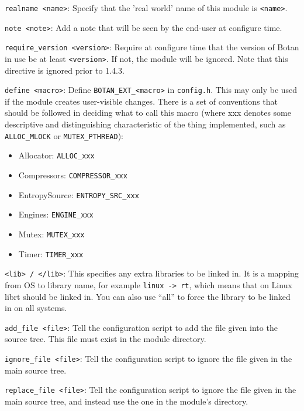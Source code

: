 \documentclass{article}
\newcommand{\filename}[1]{\texttt{#1}}
\newcommand{\macro}[1]{\texttt{#1}}
\begin{document}
\newcommand{\directive}[2]{
   \vskip 4pt
   \noindent
   \texttt{#1}: #2
}

\directive{realname <name>}{Specify that the 'real world' name of this module
   is \texttt{<name>}.}

\directive{note <note>}{Add a note that will be seen by the end-user at
configure time.}

\directive{require\_version <version>}{Require at configure time that the
version of Botan in use be at least \texttt{<version>}. If not, the module will
be ignored. Note that this directive is ignored prior to 1.4.3.}

\directive{define <macro>}{Define \macro{BOTAN\_EXT\_<macro>} in
   \filename{config.h}. This may only be used if the module creates
   user-visible changes. There is a set of conventions that should be followed
   in deciding what to call this macro (where xxx denotes some descriptive and
   distinguishing characteristic of the thing implemented, such as
   \macro{ALLOC\_MLOCK} or \macro{MUTEX\_PTHREAD}):

\begin{itemize}
\item Allocator: \macro{ALLOC\_xxx}
\item Compressors: \macro{COMPRESSOR\_xxx}
\item EntropySource: \macro{ENTROPY\_SRC\_xxx}
\item Engines: \macro{ENGINE\_xxx}
\item Mutex: \macro{MUTEX\_xxx}
\item Timer: \macro{TIMER\_xxx}
\end{itemize}
}

\directive{<lib> / </lib>}{This specifies any extra libraries to be linked in.
It is a mapping from OS to library name, for example \texttt{linux -> rt},
which means that on Linux librt should be linked in. You can also use ``all''
to force the library to be linked in on all systems.}

\directive{add\_file <file>}{Tell the configuration script to add the file
   given into the source tree. This file must exist in the module directory.}

\directive{ignore\_file <file>}{Tell the configuration script to ignore the
   file given in the main source tree.}

\directive{replace\_file <file>}{Tell the configuration script to ignore the
   file given in the main source tree, and instead use the one in the module's
   directory.}
\end{document}
